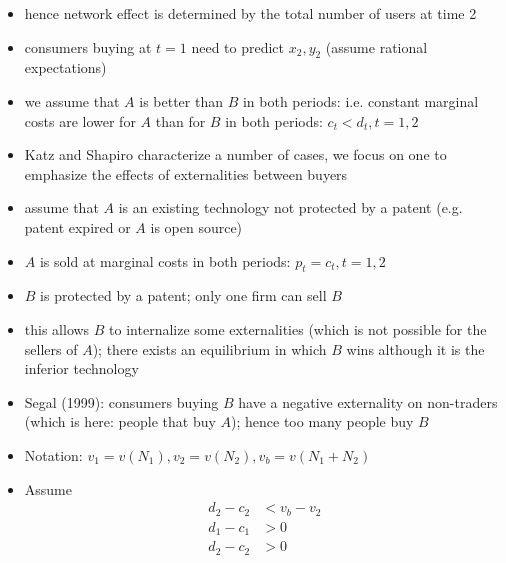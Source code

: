\documentclass[11pt,english]{beamer}
\begin{document}
\begin{frame}[allowframebreaks]
\begin{itemize}
\item hence network effect is determined by the total number of users at time 2\\
\label{sec-6-1-7}%
\item consumers buying at $t=1$ need to predict $x_{2},y_{2}$ (assume rational expectations)\\
\label{sec-6-1-8}%
\item we assume that $A$ is better than $B$ in both periods:
  i.e. constant marginal costs are lower for $A$ than for $B$ in both
  periods: $c_{t}<d_{t}, t=1,2$\\
\label{sec-6-1-9}%
\item Katz and Shapiro characterize a number of cases, we focus on one to emphasize the effects of externalities between buyers\\
\label{sec-6-1-10}%
\item assume that $A$ is an existing technology not protected by a patent (e.g. patent expired or $A$ is open source)\\
\label{sec-6-1-11}%
\item $A$ is sold at marginal costs in both periods: $p_{t}=c_{t}, t=1,2$\\
\label{sec-6-1-12}%
\item $B$ is protected by a patent; only one firm can sell $B$\\
\label{sec-6-1-13}%
\item this allows $B$ to internalize some externalities (which is not possible for the sellers of $A$); there exists an equilibrium in which $B$ wins although it is the inferior technology\\
\label{sec-6-1-14}%
\item Segal (1999): consumers buying $B$ have a negative externality on non-traders (which is here: people that buy $A$); hence too many people buy $B$\\
\label{sec-6-1-15}%
\item Notation: $v_{1}=v(N_{1}),v_{2}=v(N_{2}),v_{b}=v(N_{1}+N_{2})$\\
\label{sec-6-1-16}%
\item Assume
\label{sec-6-1-17}%
\begin{align}
\label{eq:d2c2andvbv2}
d_2-c_2 &< v_b-v_2 \\
d_1-c_1 &> 0 \\
\label{eq:d2c2Positive} d_2-c_2 &> 0
\end{align}


\end{itemize}
\end{frame}
\end{document}

